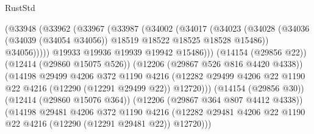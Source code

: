 \begin{lexlean}{RustStd}
\begin{coremodule}
                                (@33948
                                  (@33962
                                    (@33967
                                      (@33987
                                        (@34002
                                          (@34017
                                            (@34023
                                              (@34028
                                                (@34036
                                                  (@34039 (@34054 @34056))
                                                  @18519
                                                  @18522
                                                  @18525
                                                  @18528
                                                  @15486))
                                              @34056)))))
                                    @19933
                                    @19936
                                    @19939
                                    @19942
                                    @15486)))
                              (@14154 (@29856 @22))
                              (@12414 (@29860 @15075 @526))
                              (@12206 (@29867 @526 @816 @4420 @4338))
                              (@14198
                                @29499
                                @4206
                                @372
                                @1190
                                @4216
                                (@12282
                                  @29499
                                  @4206
                                  @22
                                  @1190
                                  @22
                                  @4216
                                  (@12290 (@12291 @29499 @22))
                                  @12720)))
                            (@14154 (@29856 @30))
                            (@12414 (@29860 @15076 @364))
                            (@12206 (@29867 @364 @807 @4412 @4338))
                            (@14198
                              @29481
                              @4206
                              @372
                              @1190
                              @4216
                              (@12282
                                @29481
                                @4206
                                @22
                                @1190
                                @22
                                @4216
                                (@12290 (@12291 @29481 @22))
                                @12720)))

\end{coremodule}
\end{lexlean}
